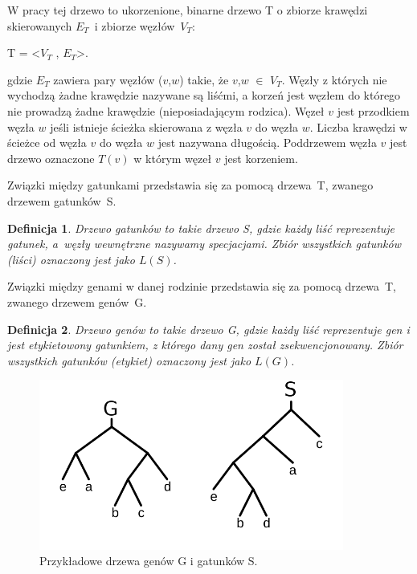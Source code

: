\documentclass[licencjacka]{pracamgr}
\newtheorem{defi}{Definicja}[section]
\begin{document}
W pracy tej drzewo to ukorzenione, binarne drzewo T o zbiorze krawędzi skierowanych $E_T$~i zbiorze węzłów~$V_T$:
\begin{center}
T = <$V_T$ , $E_T$>.
\end{center}
gdzie $E_T$ zawiera pary węzłów ($v$,$w$) takie, że $v$,$w$ $\in$ $V_T$. Węzły z których nie wychodzą żadne krawędzie nazywane są liśćmi, a korzeń jest węzłem do którego nie prowadzą żadne krawędzie (nieposiadającym rodzica). Węzeł $v$ jest przodkiem węzła $w$ jeśli istnieje ścieżka skierowana z węzła $v$ do węzła $w$. Liczba krawędzi w ścieżce od węzła $v$ do węzła $w$ jest nazywana długością. Poddrzewem węzła $v$ jest drzewo oznaczone $T(v)$ w którym węzeł $v$ jest korzeniem. 

Związki między gatunkami przedstawia się za pomocą drzewa~T, zwanego drzewem gatunków~S.
\begin{defi}\label{Drzewa gatunków}
  Drzewo gatunków to takie drzewo S, gdzie każdy liść reprezentuje gatunek, a~węzły wewnętrzne nazywamy specjacjami. Zbiór wszystkich gatunków (liści) oznaczony jest jako $L(S)$. 
\end{defi}

Związki między genami w danej rodzinie przedstawia się za pomocą drzewa~T, zwanego drzewem genów~G.
\begin{defi}\label{Drzewa genów}
  Drzewo genów to takie drzewo G, gdzie każdy liść reprezentuje gen i jest etykietowony gatunkiem, z którego dany gen został zsekwencjonowany. Zbiór wszystkich gatunków (etykiet) oznaczony jest jako $L(G)$.
\end{defi}


\begin{figure}[H]
	\centering
	\includegraphics[width=100mm]{./pictures/spec_gen.png}
	\caption{Przykładowe drzewa genów G i gatunków S.}
\end{figure}
\end{document}
